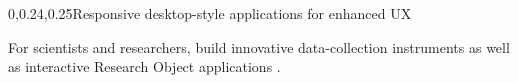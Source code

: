 \begin{frame}{}
{\begin{center}
\begin{minipage}{.9\textwidth}
{\begin{minipage}{\textwidth}
\begin{lightquadblockc}{0,0.24,0.25}{Responsive desktop-style applications for enhanced UX}
\begin{itemize}
\sqitem   {\lsep} \parbox[t]{17cm}{For scientists and researchers, 
build innovative data-collection instruments 
as well as interactive Research Object applications 
{\color[rgb]{0.3,0,0.1}{(slides 18-20)}}.}\vspace{1.5em}
\end{itemize} 
\end{lightquadblockc}
\end{minipage}}

\end{minipage}
\end{center}
}

\end{frame}
